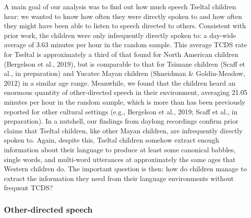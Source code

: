 \documentclass[,man,floatsintext]{apa6}
\begin{document}
A main goal of our analysis was to find out how much speech Tseltal
children hear: we wanted to know how often they were directly spoken to
and how often they might have been able to listen to speech directed to
others. Consistent with prior work, the children were only infrequently
directly spoken to: a day-wide average of 3.63 minutes per hour in the
random sample. This average TCDS rate for Tseltal is approximately a
third of that found for North American children (Bergelson et al.,
2019), but is comparable to that for Tsimane children (Scaff et al., in
preparation) and Yucatec Mayan children (Shneidman \& Goldin-Meadow,
2012) in a similar age range. Meanwhile, we found that the children
heard an enormous quantity of other-directed speech in their
environment, averaging 21.05 minutes per hour in the random sample,
which is more than has been previously reported for other cultural
settings (e.g., Bergelson et al., 2019; Scaff et al., in preparation).
In a nutshell, our findings from daylong recordings confirm prior claims
that Tseltal children, like other Mayan children, are infrequently
directly spoken to. Again, despite this, Tseltal children somehow
extract enough information about their language to produce at least some
canonical babbles, single words, and multi-word utterances at
approximately the same ages that Western children do. The important
question is then: how do children manage to extract the information they
need from their language environments without frequent TCDS?

\subsubsection{Other-directed speech}\label{other-directed-speech}
\end{document}
